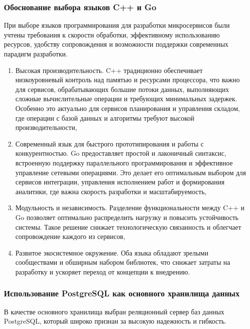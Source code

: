 \documentclass[14pt,a4paper]{extarticle}
\begin{document}
\subsubsection{Обоснование выбора языков C++ и Go}

При выборе языков программирования для разработки микросервисов были учтены требования к скорости обработки, эффективному использованию ресурсов, удобству сопровождения и возможности поддержки современных парадигм разработки.

\begin{enumerate}
\item Высокая производительность. C++ традиционно обеспечивает низкоуровневый контроль над памятью и ресурсами процессора, что важно для сервисов, обрабатывающих большие потоки данных, выполняющих сложные вычислительные операции и требующих минимальных задержек. Особенно это актуально для сервисов планирования и управления складом, где операции с базой данных и алгоритмы требуют высокой производительности,

\item Современный язык для быстрого прототипирования и работы с конкурентностью. Go предоставляет простой и лаконичный синтаксис, встроенную поддержку параллельного программирования и эффективное управление сетевыми операциями. Это делает его оптимальным выбором для сервисов интеграции, управления исполнением работ и формирования аналитики, где важна скорость разработки и масштабируемость,

\item Модульность и независимость. Разделение функциональности между C++ и Go позволяет оптимально распределить нагрузку и повысить устойчивость системы. Такое решение снижает технологическую связанность и облегчает сопровождение каждого из сервисов,

\item Развитое экосистемное окружение. Оба языка обладают зрелыми сообществами и обширным набором библиотек, что снижает затраты на разработку и ускоряет переход от концепции к внедрению.
\end{enumerate}

\subsubsection{Использование PostgreSQL как основного хранилища данных}

В качестве основного хранилища выбран реляционный сервер баз данных PostgreSQL, который широко признан за высокую надежность и гибкость.
\end{document}
